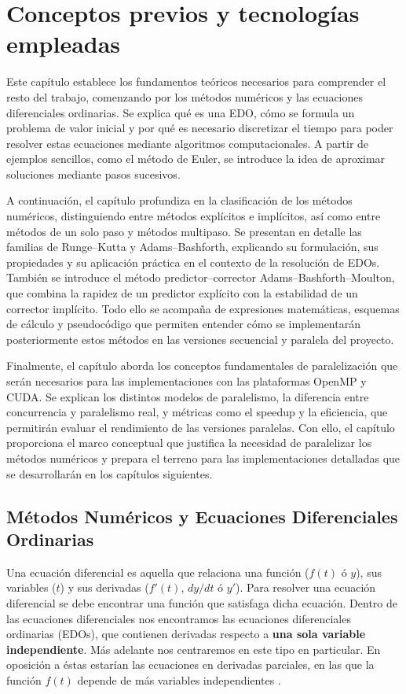 \chapter{Conceptos previos y tecnologías empleadas}

Este capítulo establece los fundamentos teóricos necesarios para comprender el resto del trabajo, comenzando por los métodos numéricos y las ecuaciones diferenciales ordinarias. Se explica qué es una EDO, cómo se formula un problema de valor inicial y por qué es necesario discretizar el tiempo para poder resolver estas ecuaciones mediante algoritmos computacionales. A partir de ejemplos sencillos, como el método de Euler, se introduce la idea de aproximar soluciones mediante pasos sucesivos.

A continuación, el capítulo profundiza en la clasificación de los métodos numéricos, distinguiendo entre métodos explícitos e implícitos, así como entre métodos de un solo paso y métodos multipaso. Se presentan en detalle las familias de Runge–Kutta y Adams–Bashforth, explicando su formulación, sus propiedades y su aplicación práctica en el contexto de la resolución de EDOs. También se introduce el método predictor–corrector Adams–Bashforth–Moulton, que combina la rapidez de un predictor explícito con la estabilidad de un corrector implícito. Todo ello se acompaña de expresiones matemáticas, esquemas de cálculo y pseudocódigo que permiten entender cómo se implementarán posteriormente estos métodos en las versiones secuencial y paralela del proyecto.

Finalmente, el capítulo aborda los conceptos fundamentales de paralelización que serán necesarios para las implementaciones con las plataformas OpenMP y CUDA. Se explican los distintos modelos de paralelismo, la diferencia entre concurrencia y paralelismo real, y métricas como el speedup y la eficiencia, que permitirán evaluar el rendimiento de las versiones paralelas. Con ello, el capítulo proporciona el marco conceptual que justifica la necesidad de paralelizar los métodos numéricos y prepara el terreno para las implementaciones detalladas que se desarrollarán en los capítulos siguientes.

\section{Métodos Numéricos y Ecuaciones Diferenciales Ordinarias}

Una ecuación diferencial es aquella que relaciona una función ($f(t)$ ó $y$), sus variables ($t$) y sus derivadas ($f'(t)$, $dy/dt$ ó $y'$). Para resolver una ecuación diferencial se debe encontrar una función que satisfaga dicha ecuación. Dentro de las ecuaciones diferenciales nos encontramos las ecuaciones diferenciales ordinarias (EDOs), que contienen derivadas respecto a \textbf{una sola variable independiente}. Más adelante nos centraremos en este tipo en particular. En oposición a éstas estarían las ecuaciones en derivadas parciales, en las que la función $f(t)$ depende de más variables independientes \cite{Molero2007}.

